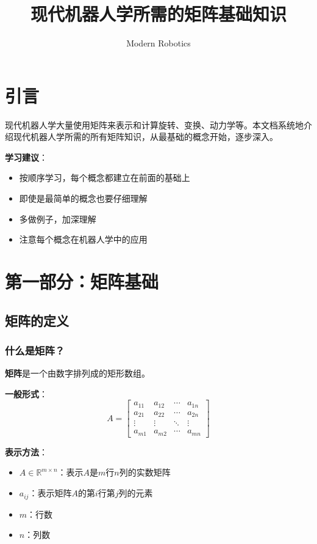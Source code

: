 \documentclass[12pt,a4paper]{article}
\title{现代机器人学所需的矩阵基础知识}
\author{Modern Robotics}
\date{}
\begin{document}
\maketitle

\tableofcontents
\newpage

\section{引言}

现代机器人学大量使用矩阵来表示和计算旋转、变换、动力学等。本文档系统地介绍现代机器人学所需的所有矩阵知识，从最基础的概念开始，逐步深入。

\textbf{学习建议}：
\begin{itemize}
\item 按顺序学习，每个概念都建立在前面的基础上
\item 即使是最简单的概念也要仔细理解
\item 多做例子，加深理解
\item 注意每个概念在机器人学中的应用
\end{itemize}

\section{第一部分：矩阵基础}

\subsection{矩阵的定义}

\subsubsection{什么是矩阵？}

\textbf{矩阵}是一个由数字排列成的矩形数组。

\textbf{一般形式}：
\begin{equation}
A = \begin{bmatrix}
a_{11} & a_{12} & \cdots & a_{1n} \\
a_{21} & a_{22} & \cdots & a_{2n} \\
\vdots & \vdots & \ddots & \vdots \\
a_{m1} & a_{m2} & \cdots & a_{mn}
\end{bmatrix}
\end{equation}

\textbf{表示方法}：
\begin{itemize}
\item $A \in \mathbb{R}^{m \times n}$：表示$A$是$m$行$n$列的实数矩阵
\item $a_{ij}$：表示矩阵$A$的第$i$行第$j$列的元素
\item $m$：行数
\item $n$：列数
\end{itemize}
\end{document}
